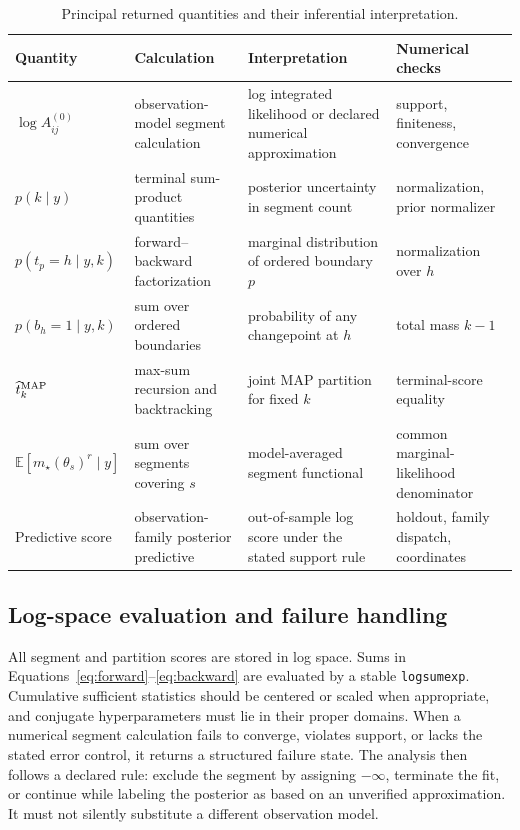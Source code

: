 \begin{table}[!htbp]
\centering
\small
\caption{Principal returned quantities and their inferential interpretation.}
\label{tab:exported-objects}
\begin{tabularx}{0.96\textwidth}{@{}L{0.19\textwidth}L{0.22\textwidth}Y L{0.18\textwidth}@{}}
\toprule
Quantity & Calculation & Interpretation & Numerical checks \\
\midrule
$\log A^{(0)}_{ij}$ & observation-model segment calculation & log integrated likelihood or declared numerical approximation & support, finiteness, convergence \\
$p(k\mid y)$ & terminal sum-product quantities & posterior uncertainty in segment count & normalization, prior normalizer \\
$p(t_p=h\mid y,k)$ & forward--backward factorization & marginal distribution of ordered boundary $p$ & normalization over $h$ \\
$p(b_h=1\mid y,k)$ & sum over ordered boundaries & probability of any changepoint at $h$ & total mass $k-1$ \\
$\widehat t^{\rm MAP}_k$ & max-sum recursion and backtracking & joint MAP partition for fixed $k$ & terminal-score equality \\
$\mathbb E[m_\star(\theta_s)^r\mid y]$ & sum over segments covering $s$ & model-averaged segment functional & common marginal-likelihood denominator \\
Predictive score & observation-family posterior predictive & out-of-sample log score under the stated support rule & holdout, family dispatch, coordinates \\
\bottomrule
\end{tabularx}
\end{table}

\subsection{Log-space evaluation and failure handling}
All segment and partition scores are stored in log space. Sums in Equations~\eqref{eq:forward}--\eqref{eq:backward} are evaluated by a stable \texttt{logsumexp}. Cumulative sufficient statistics should be centered or scaled when appropriate, and conjugate hyperparameters must lie in their proper domains. When a numerical segment calculation fails to converge, violates support, or lacks the stated error control, it returns a structured failure state. The analysis then follows a declared rule: exclude the segment by assigning $-\infty$, terminate the fit, or continue while labeling the posterior as based on an unverified approximation. It must not silently substitute a different observation model.

